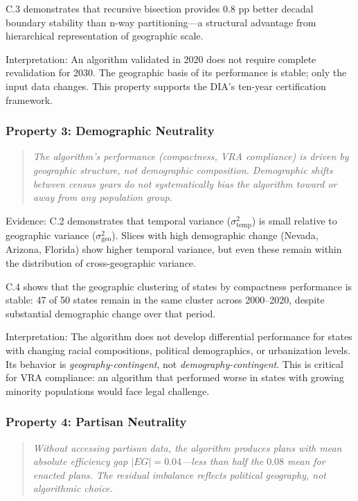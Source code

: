 C.3 demonstrates that recursive bisection provides $0.8$ pp better
decadal boundary stability than n-way partitioning---a structural
advantage from hierarchical representation of geographic scale.

Interpretation: An algorithm validated in 2020 does not require
complete revalidation for 2030. The geographic basis of its performance
is stable; only the input data changes. This property supports the DIA's
ten-year certification framework.

\subsubsection{Property 3: Demographic Neutrality}

\begin{quote}
\textit{The algorithm's performance (compactness, VRA compliance)
is driven by geographic structure, not demographic composition.
Demographic shifts between census years do not systematically bias
the algorithm toward or away from any population group.}
\end{quote}

Evidence: C.2 demonstrates that temporal variance ($\sigma^2_\text{temp}$)
is small relative to geographic variance ($\sigma^2_\text{geo}$). Slices
with high demographic change (Nevada, Arizona, Florida) show higher
temporal variance, but even these remain within the distribution of
cross-geographic variance.

C.4 shows that the geographic clustering of states by compactness
performance is stable: 47 of 50 states remain in the same cluster
across 2000--2020, despite substantial demographic change over that
period.

Interpretation: The algorithm does not develop differential performance
for states with changing racial compositions, political demographics,
or urbanization levels. Its behavior is \emph{geography-contingent},
not \emph{demography-contingent}. This is critical for VRA compliance:
an algorithm that performed worse in states with growing minority
populations would face legal challenge.

\subsubsection{Property 4: Partisan Neutrality}

\begin{quote}
\textit{Without accessing partisan data, the algorithm produces plans
with mean absolute efficiency gap $|EG| = 0.04$---less than half the
$0.08$ mean for enacted plans. The residual imbalance reflects
political geography, not algorithmic choice.}
\end{quote}

